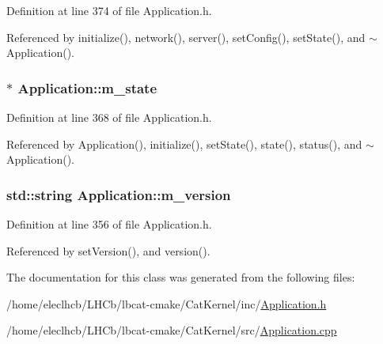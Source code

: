 Definition at line 374 of file Application.h.

Referenced by initialize(), network(), server(), setConfig(), setState(), and $\sim$Application().\hypertarget{classApplication_a0ef9832e2d286716e597a1ff21ffcab4}{
\subsubsection[{m\_\-state}]{$\ast$ {\bf Application::m\_\-state}}}
\label{classApplication_a0ef9832e2d286716e597a1ff21ffcab4}


Definition at line 368 of file Application.h.

Referenced by Application(), initialize(), setState(), state(), status(), and $\sim$Application().\hypertarget{classApplication_acbbdbd17a3a66782c54dbbe58a9ca8d8}{
\subsubsection[{m\_\-version}]{\setlength{\rightskip}{0pt plus 5cm}std::string {\bf Application::m\_\-version}}}
\label{classApplication_acbbdbd17a3a66782c54dbbe58a9ca8d8}


Definition at line 356 of file Application.h.

Referenced by setVersion(), and version().

The documentation for this class was generated from the following files:\begin{DoxyCompactItemize}
\item 
/home/eleclhcb/LHCb/lbcat-\/cmake/CatKernel/inc/\hyperlink{Application_8h}{Application.h}\item 
/home/eleclhcb/LHCb/lbcat-\/cmake/CatKernel/src/\hyperlink{Application_8cpp}{Application.cpp}\end{DoxyCompactItemize}
